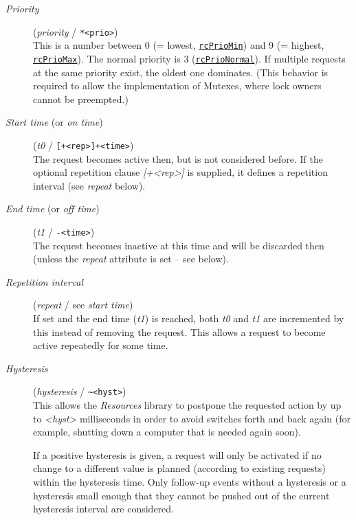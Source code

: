 \documentclass[12pt,english,parskip=half,headheight=19pt]{scrreprt}
\newcommand{\refapic}[1]{\href{home2l-api_c/index.html}{\mbox{\texttt{#1}}}}            %
\begin{document}
\begin{description}

\item[\textit{Priority}] (\textit{priority} / \texttt{*<prio>}) \\
  This is a number between 0 (= lowest, \refapic{rcPrioMin}) and 9 (= highest, \refapic{rcPrioMax}).
  The normal priority is 3 (\refapic{rcPrioNormal}). If multiple requests at the same priority exist,
  the oldest one dominates. (This behavior is required to allow the implementation of Mutexes,
  where lock owners cannot be preempted.)

\item[\textit{Start time} (or \textit{on time})] (\textit{t0} / \texttt{[+<rep>]+<time>}) \\
  The request becomes active then, but is not considered before.
  If the optional repetition clause \textit{[+<rep>]} is supplied, it defines a repetition interval
  (see \textit{repeat} below).

\item[\textit{End time} (or \textit{off time})] (\textit{t1} / \texttt{-<time>}) \\
  The request becomes inactive at this time and will be discarded then
  (unless the \textit{repeat} attribute is set -- see below).

\item[\textit{Repetition interval}] (\textit{repeat} / see \textit{start time}) \\
  If set and the end time (\textit{t1}) is reached, both \textit{t0} and \textit{t1} are incremented by
  this instead of removing the request. This allows a request to become active repeatedly for some time.

\item[\textit{Hysteresis}] (\textit{hysteresis} / \texttt{\~{}<hyst>}) \\
  This allows the \textit{Resources} library to postpone the requested action by up to
  \textit{<hyst>} milliseconds in order to avoid switches forth and
  back again (for example, shutting down a computer that is needed again soon).

  If a positive hysteresis is given, a request will only be activated if
  no change to a different value is planned (according to existing
  requests) within the hysteresis time. Only follow-up events without a
  hysteresis or a hysteresis small enough that they cannot be pushed out
  of the current hysteresis interval are considered.

\end{description}
\end{document}
